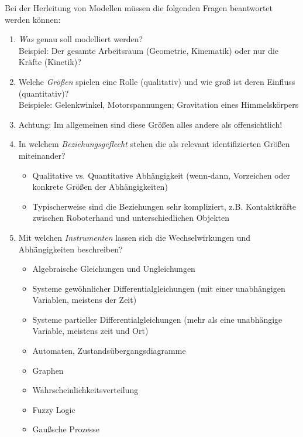 \documentclass[a4paper, 11pt, accentcolor = tud3b]{tudreport}
\begin{document}
                Bei der Herleitung von Modellen müssen die folgenden Fragen beantwortet werden können:
                \begin{enumerate}
                	\item \textit{Was} genau soll modelliert werden? \\ Beispiel: Der gesamte Arbeitsraum (Geometrie, Kinematik) oder nur die Kräfte (Kinetik)?
                	\item Welche \textit{Größen} spielen eine Rolle (qualitativ) und wie groß ist deren Einfluss (quantitativ)? \\ Beispiele: Gelenkwinkel, Motorspannungen; Gravitation eines Himmelskörpers
                	\item[] Achtung: Im allgemeinen sind diese Größen alles andere als offensichtlich!
                	\item In welchem \textit{Beziehungsgeflecht} stehen die als relevant identifizierten Größen miteinander?
	                	\begin{itemize}
	                		\item Qualitative vs. Quantitative Abhängigkeit (wenn-dann, Vorzeichen oder konkrete Größen der Abhängigkeiten)
	                		\item Typischerweise sind die Beziehungen sehr kompliziert, z.B. Kontaktkräfte zwischen Roboterhand und unterschiedlichen Objekten
	                	\end{itemize}
                	\item Mit welchen \textit{Instrumenten} lassen sich die Wechselwirkungen und Abhängigkeiten beschreiben?
	                	\begin{itemize}
	                		\item Algebraische Gleichungen und Ungleichungen
	                		\item Systeme gewöhnlicher Differentialgleichungen (mit einer unabhängigen Variablen, meistens der Zeit)
	                		\item Systeme partieller Differentialgleichungen (mehr als eine unabhängige Variable, meistens zeit und Ort)
	                		\item Automaten, Zustandsübergangsdiagramme
	                		\item Graphen
	                		\item Wahrscheinlichkeitsverteilung
	                		\item Fuzzy Logic
	                		\item Gaußsche Prozesse

\end{itemize}
\end{enumerate}
\end{document}
